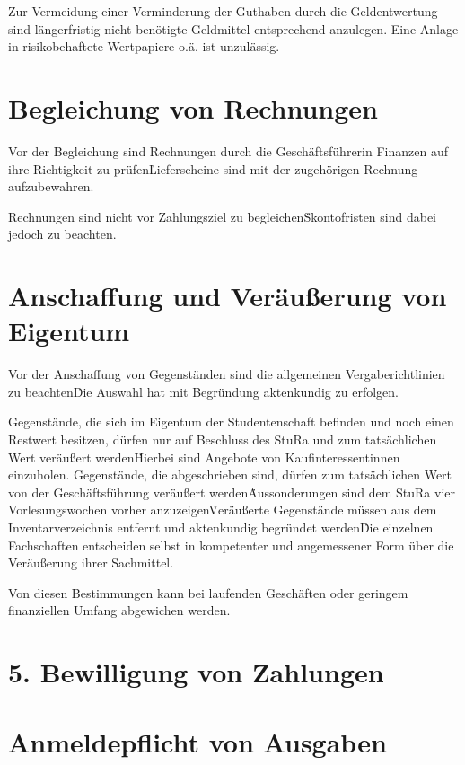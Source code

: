 \Abs \Satz Zur Vermeidung einer Verminderung der Guthaben durch die Geldentwertung sind längerfristig nicht benötigte Geldmittel entsprechend anzulegen. Eine Anlage in risikobehaftete Wertpapiere o.ä. ist unzulässig.



\section{Begleichung von Rechnungen}

\Abs \Satz Vor der Begleichung sind Rechnungen durch die Geschäftsführerin Finanzen auf ihre Richtigkeit zu prüfen\. Lieferscheine sind mit der zugehörigen Rechnung aufzubewahren.

\Abs \Satz Rechnungen sind nicht vor Zahlungsziel zu begleichen\. Skontofristen sind dabei jedoch zu beachten.



\section{Anschaffung und Veräußerung von Eigentum}

\Abs \Satz Vor der Anschaffung von Gegenständen sind die allgemeinen Vergaberichtlinien zu beachten\. Die Auswahl hat mit Begründung aktenkundig zu erfolgen.

\Abs \Satz Gegenstände, die sich im Eigentum der Studentenschaft befinden und noch einen Restwert besitzen, dürfen nur auf Beschluss des StuRa und zum tatsächlichen Wert veräußert werden\. Hierbei sind Angebote von Kaufinteressentinnen einzuholen. Gegenstände, die abgeschrieben sind, dürfen zum tatsächlichen Wert von der Geschäftsführung veräußert werden\. Aussonderungen sind dem StuRa vier Vorlesungswochen vorher anzuzeigen\. Veräußerte Gegenstände müssen aus dem Inventarverzeichnis entfernt und aktenkundig begründet werden\. Die einzelnen Fachschaften entscheiden selbst in kompetenter und angemessener Form über die Veräußerung ihrer Sachmittel.

\Abs \Satz Von diesen Bestimmungen kann bei laufenden Geschäften oder geringem finanziellen Umfang abgewichen werden.


\section*{5. Bewilligung von Zahlungen}



\section{Anmeldepflicht von Ausgaben}


